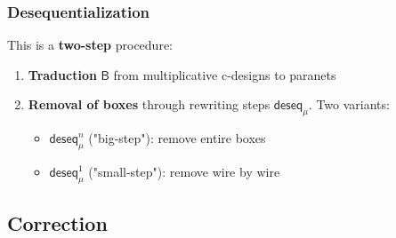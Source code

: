\documentclass[usenames,dvipsnames]{beamer}
\begin{document}
\begin{frame}[fragile]
    \frametitle{Desequentialization}
    This is a \textbf{two-step} procedure:
    \vspace{1em}
    \begin{mathpar}
    \end{mathpar}
    \vspace{-2em}
    \begin{enumerate}
        \setlength\itemsep{1em}
        \item \textbf{Traduction} $\mathsf{B}$ from multiplicative c-designs to paranets
        \item \textbf{Removal of boxes} through rewriting steps $\mathsf{deseq}_μ$. Two variants:
        \begin{itemize}
            \item $\mathsf{deseq}_μ^n$ ("big-step"): remove entire boxes
            \item $\mathsf{deseq}_μ^1$ ("small-step"): remove wire by wire
        \end{itemize}
    \end{enumerate}
\end{frame}

\subsection{Correction}
\end{document}
